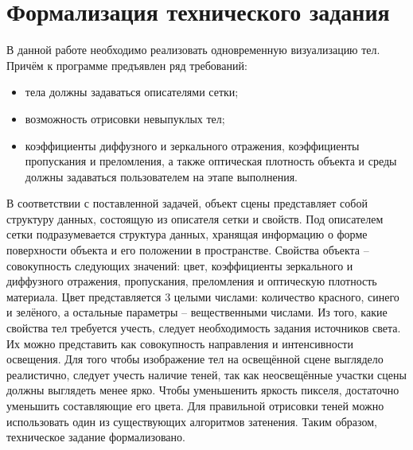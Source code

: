 \section{Формализация технического задания}
В данной работе необходимо реализовать одновременную визуализацию тел.
Причём к программе предъявлен ряд требований:
\begin{itemize}
    \item тела должны задаваться описателями сетки;
    \item возможность отрисовки невыпуклых тел;
    \item
        коэффициенты диффузного и зеркального отражения,
        коэффициенты пропускания и преломления,
        а также оптическая плотность объекта и среды
        должны задаваться пользователем на этапе выполнения.
\end{itemize}
В соответствии с поставленной задачей, объект сцены представляет собой
структуру данных, состоящую из описателя сетки и свойств.
Под описателем сетки подразумевается структура данных, хранящая
информацию о форме поверхности объекта и его положении в пространстве.
Свойства объекта -- совокупность следующих значений:
цвет, коэффициенты зеркального и диффузного отражения, пропускания,
преломления и оптическую плотность материала.
Цвет представляется 3 целыми числами: количество красного, синего и зелёного,
а остальные параметры -- вещественными числами.
Из того, какие свойства тел требуется учесть, следует необходимость
задания источников света.
Их можно представить как совокупность направления и интенсивности освещения.
Для того чтобы изображение тел на освещённой сцене выглядело реалистично,
следует учесть наличие теней, так как неосвещённые участки сцены должны
выглядеть менее ярко.
Чтобы уменьшенить яркость пикселя,
достаточно уменьшить составляющие его цвета.
Для правильной отрисовки теней можно использовать один
из существующих алгоритмов затенения.
Таким образом, техническое задание формализовано.
